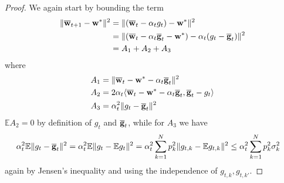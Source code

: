 \begin{proof}
	We again start by bounding the term
	\begin{align*}
	\|{\overline{\mathbf{w}}}_{t+1}-{\mathbf{w}}^{\ast}\|^{2} & =\|({\overline{\mathbf{w}}}_{t}-\alpha_{t}g_{t})-{\mathbf{w}}^{\ast}\|^{2}\\
	& =\|({\overline{\mathbf{w}}}_{t}-\alpha_{t}{\overline{\mathbf{g}}}_{t}-{\mathbf{w}}^{\ast})-\alpha_{t}(g_{t}-{\overline{\mathbf{g}}}_{t})\|^{2}\\
	& =A_{1}+A_{2}+A_{3}
	\end{align*}
	where 
	\begin{align*}
	A_{1} & =\|{\overline{\mathbf{w}}}_{t}-{\mathbf{w}}^{\ast}-\alpha_{t}{\overline{\mathbf{g}}}_{t}\|^{2}\\
	A_{2} & =2\alpha_{t}\langle{\overline{\mathbf{w}}}_{t}-{\mathbf{w}}^{\ast}-\alpha_{t}{\overline{\mathbf{g}}}_{t},{\overline{\mathbf{g}}}_{t}-g_{t}\rangle\\
	A_{3} & =\alpha_{t}^{2}\|g_{t}-{\overline{\mathbf{g}}}_{t}\|^{2}
	\end{align*}
	$\mathbb{E}A_{2}=0$ by definition of $g_{t}$ and ${\overline{\mathbf{g}}}_{t}$,
	while for $A_{3}$ we have
	\begin{align*}
	\alpha_{t}^{2}\mathbb{E}\|g_{t}-{\overline{\mathbf{g}}}_{t}\|^{2} & =\alpha_{t}^{2}\mathbb{E}\|g_{t}-\mathbb{E}g_{t}\|^{2}=\alpha_{t}^{2}\sum_{k=1}^{N}p_{k}^{2}\|g_{t,k}-\mathbb{E}g_{t,k}\|^{2}\leq\alpha_{t}^{2}\sum_{k=1}^{N}p_{k}^{2}\sigma_{k}^{2}
	\end{align*}
	again by Jensen's inequality and using the independence of $g_{t,k},g_{t,k'}$. 
	

\end{proof}
